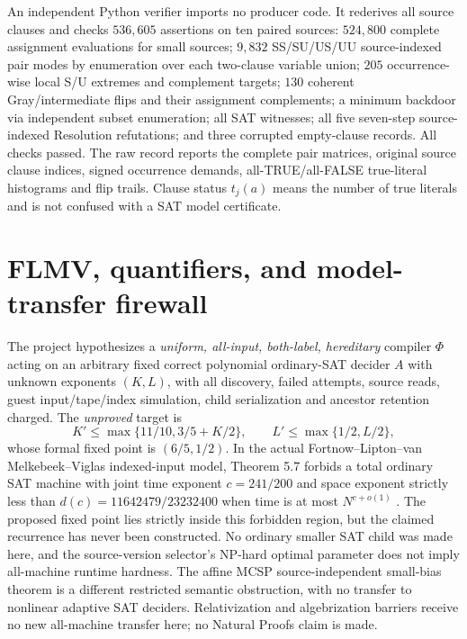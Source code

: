 \documentclass[11pt]{article}
\begin{document}
An independent Python verifier imports no producer code. It rederives all source clauses and checks $536{,}605$ assertions on ten paired sources: $524{,}800$ complete assignment evaluations for small sources; $9{,}832$ SS/SU/US/UU source-indexed pair modes by enumeration over each two-clause variable union; $205$ occurrence-wise local S/U extremes and complement targets; $130$ coherent Gray/intermediate flips and their assignment complements; a minimum backdoor via independent subset enumeration; all SAT witnesses; all five seven-step source-indexed Resolution refutations; and three corrupted empty-clause records. All checks passed. The raw record reports the complete pair matrices, original source clause indices, signed occurrence demands, all-TRUE/all-FALSE true-literal histograms and flip trails. Clause status $t_j(a)$ means the number of true literals and is not confused with a SAT model certificate.

\section*{FLMV, quantifiers, and model-transfer firewall}
The project hypothesizes a \emph{uniform, all-input, both-label, hereditary} compiler $\Phi$ acting on an arbitrary fixed correct polynomial ordinary-SAT decider $A$ with unknown exponents $(K,L)$, with all discovery, failed attempts, source reads, guest input/tape/index simulation, child serialization and ancestor retention charged. The \emph{unproved} target is
\[
K'\le\max\{11/10,3/5+K/2\},\qquad
L'\le\max\{1/2,L/2\},
\]
whose formal fixed point is $(6/5,1/2)$. In the actual Fortnow--Lipton--van Melkebeek--Viglas indexed-input model, Theorem 5.7 forbids a total ordinary SAT machine with joint time exponent $c=241/200$ and space exponent strictly less than $d(c)=11642479/23232400$ when time is at most $N^{c+o(1)}$ \cite{flmv2005}. The proposed fixed point lies strictly inside this forbidden region, but the claimed recurrence has never been constructed. No ordinary smaller SAT child was made here, and the source-version selector's NP-hard optimal parameter does not imply all-machine runtime hardness. The affine MCSP source-independent small-bias theorem is a different restricted semantic obstruction, with no transfer to nonlinear adaptive SAT deciders. Relativization and algebrization barriers receive no new all-machine transfer here; no Natural Proofs claim is made.
\end{document}
